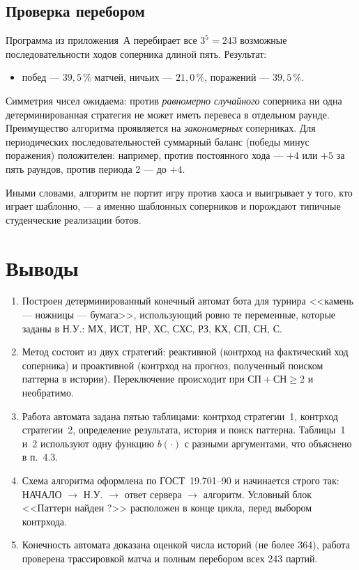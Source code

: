 \documentclass[a4paper,14pt]{extarticle}
\begin{document}
\subsection{Проверка перебором}

Программа из приложения~А перебирает все $3^5=243$ возможные
последовательности ходов соперника длиной пять. Результат:

\begin{itemize}
\item побед --- $39{,}5\,\%$ матчей, ничьих --- $21{,}0\,\%$,
      поражений --- $39{,}5\,\%$.
\end{itemize}

Симметрия чисел ожидаема: против \emph{равномерно случайного} соперника ни одна
детерминированная стратегия не может иметь перевеса в отдельном раунде.
Преимущество алгоритма проявляется на \emph{закономерных} соперниках. Для
периодических последовательностей суммарный баланс (победы минус поражения)
положителен: например, против постоянного хода --- $+4$ или $+5$ за пять
раундов, против периода 2 --- до $+4$.

Иными словами, алгоритм не портит игру против хаоса и выигрывает у того, кто
играет шаблонно, --- а именно шаблонных соперников и порождают типичные
студенческие реализации ботов.

\section{Выводы}

\begin{enumerate}
\item Построен детерминированный конечный автомат бота для турнира
      <<камень --- ножницы --- бумага>>, использующий ровно те переменные,
      которые заданы в Н.У.: МХ, ИСТ, НР, ХС, СХС, РЗ, КХ, СП, СН, С.
\item Метод состоит из двух стратегий: реактивной (контрход на фактический
      ход соперника) и проактивной (контрход на прогноз, полученный поиском
      паттерна в истории). Переключение происходит при
      $\text{СП}+\text{СН}\ge2$ и необратимо.
\item Работа автомата задана пятью таблицами: контрход стратегии~1, контрход
      стратегии~2, определение результата, история и поиск паттерна.
      Таблицы~1 и~2 используют одну функцию $b(\cdot)$ с разными аргументами,
      что объяснено в п.~4.3.
\item Схема алгоритма оформлена по ГОСТ~19.701--90 и начинается строго так:
      НАЧАЛО $\to$ Н.У. $\to$ ответ сервера $\to$ алгоритм. Условный блок
      <<Паттерн найден ?>> расположен в конце цикла, перед выбором контрхода.
\item Конечность автомата доказана оценкой числа историй (не более 364),
      работа проверена трассировкой матча и полным перебором всех 243 партий.
\end{enumerate}
\end{document}
